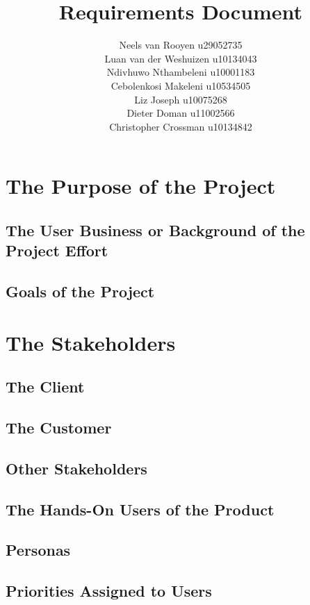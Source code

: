 \documentclass[12pt,a4paper]{article}
\begin{document}
\title{Requirements Document}
\author{Neels van Rooyen u29052735\\
Luan van der Weshuizen u10134043\\
Ndivhuwo Nthambeleni u10001183\\
Cebolenkosi Makeleni u10534505\\
Liz Joseph u10075268\\
Dieter Doman u11002566\\
Christopher Crossman u10134842}
\maketitle
\pagebreak
\section{The Purpose of the Project}
\subsection{The User Business or Background of the Project Effort}
\subsection{Goals of the Project}
\pagebreak
\section{The Stakeholders}
\subsection{The Client}
\subsection{The Customer}
\subsection{Other Stakeholders}
\subsection{The Hands-On Users of the Product}
\subsection{Personas}
\subsection{Priorities Assigned to Users}
\end{document}
